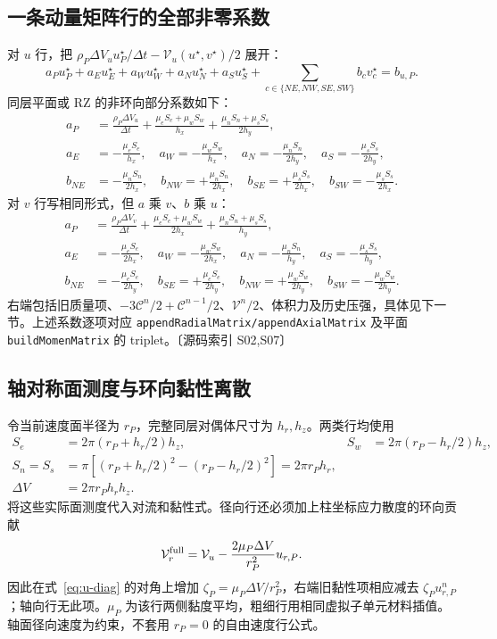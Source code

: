 \documentclass[UTF8,a4paper,11pt,fontset=fandol]{ctexart}
\newcommand{\code}[1]{\nolinkurl{#1}}
\newcommand{\src}[1]{\textcolor{ink}{\small〔源码索引 #1〕}}
\newcommand{\dt}{\Delta t}
\begin{document}
\subsection{一条动量矩阵行的全部非零系数}
对 $u$ 行，把 $\rho_P\Delta V_u u_P^\star/\dt-\mathcal V_u(u^\star,v^\star)/2$ 展开：
\begin{equation}
 a_Pu_P^\star+a_Eu_E^\star+a_Wu_W^\star+a_Nu_N^\star+a_Su_S^\star
 +\sum_{c\in\{NE,NW,SE,SW\}}b_cv_c^\star=b_{u,P}.
\end{equation}
同层平面或 RZ 的非环向部分系数如下：
\begin{align}
 a_P&=\frac{\rho_P\Delta V_u}{\dt}
       +\frac{\mu_eS_e+\mu_wS_w}{h_x}
       +\frac{\mu_nS_n+\mu_sS_s}{2h_y},\label{eq:u-diag}\\
 a_E&=-\frac{\mu_eS_e}{h_x},\quad a_W=-\frac{\mu_wS_w}{h_x},\quad
 a_N=-\frac{\mu_nS_n}{2h_y},\quad a_S=-\frac{\mu_sS_s}{2h_y},\\
 b_{NE}&=-\frac{\mu_nS_n}{2h_x},\quad b_{NW}=+\frac{\mu_nS_n}{2h_x},\quad
 b_{SE}=+\frac{\mu_sS_s}{2h_x},\quad b_{SW}=-\frac{\mu_sS_s}{2h_x}.
\end{align}
对 $v$ 行写相同形式，但 $a$ 乘 $v$、$b$ 乘 $u$：
\begin{align}
 a_P&=\frac{\rho_P\Delta V_v}{\dt}
       +\frac{\mu_eS_e+\mu_wS_w}{2h_x}
       +\frac{\mu_nS_n+\mu_sS_s}{h_y},\\
 a_E&=-\frac{\mu_eS_e}{2h_x},\quad a_W=-\frac{\mu_wS_w}{2h_x},\quad
 a_N=-\frac{\mu_nS_n}{h_y},\quad a_S=-\frac{\mu_sS_s}{h_y},\\
 b_{NE}&=-\frac{\mu_eS_e}{2h_y},\quad b_{SE}=+\frac{\mu_eS_e}{2h_y},\quad
 b_{NW}=+\frac{\mu_wS_w}{2h_y},\quad b_{SW}=-\frac{\mu_wS_w}{2h_y}.
\end{align}
右端包括旧质量项、$-3\mathcal C^n/2+\mathcal C^{n-1}/2$、$\mathcal V^n/2$、体积力及历史压强，具体见下一节。上述系数逐项对应 \code{appendRadialMatrix/appendAxialMatrix} 及平面 \code{buildMomenMatrix} 的 triplet。\src{S02,S07}

\subsection{轴对称面测度与环向黏性离散}
令当前速度面半径为 $r_P$，完整同层对偶体尺寸为 $h_r,h_z$。两类行均使用
\begin{align}
 S_e&=2\pi(r_P+h_r/2)h_z,&S_w&=2\pi(r_P-h_r/2)h_z,\\
 S_n=S_s&=\pi[(r_P+h_r/2)^2-(r_P-h_r/2)^2]=2\pi r_Ph_r,\\
 \Delta V&=2\pi r_Ph_rh_z.
\end{align}
将这些实际面测度代入对流和黏性式。径向行还必须加上柱坐标应力散度的环向贡献
\begin{equation}
 \mathcal V_r^{\rm full}=\mathcal V_u-\frac{2\mu_P\Delta V}{r_P^2}u_{r,P}.
\end{equation}
因此在式~\eqref{eq:u-diag} 的对角上增加 $\zeta_P=\mu_P\Delta V/r_P^2$，右端旧黏性项相应减去 $\zeta_Pu_{r,P}^n$；轴向行无此项。$\mu_P$ 为该行两侧黏度平均，粗细行用相同虚拟子单元材料插值。轴面径向速度为约束，不套用 $r_P=0$ 的自由速度行公式。
\end{document}

